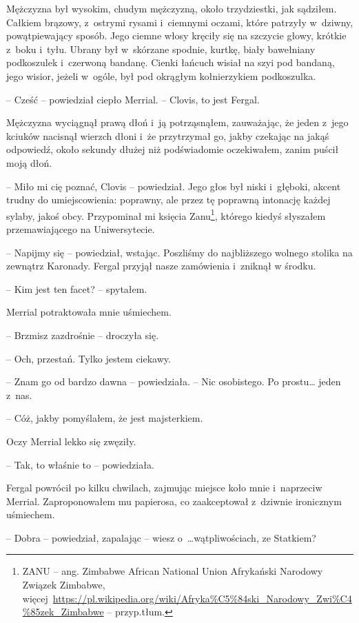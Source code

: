 \documentclass[oneside,polish,11pt,sfheadings]{mwbk}
\begin{document}
Mężczyzna był wysokim, chudym mężczyzną, około trzydziestki, jak
sądziłem. Całkiem brązowy, z~ostrymi rysami i~ciemnymi oczami, które
patrzyły w~dziwny, powątpiewający sposób. Jego ciemne włosy kręciły się
na szczycie głowy, krótkie z~boku i~tyłu. Ubrany był w~skórzane spodnie,
kurtkę, biały bawełniany podkoszulek i~czerwoną bandanę. Cienki łańcuch
wisiał na szyi pod bandaną, jego wisior, jeżeli w~ogóle, był pod okrągłym
kołnierzykiem podkoszulka.

-- Cześć -- powiedział ciepło Merrial. -- Clovis, to jest Fergal.

Mężczyzna wyciągnął prawą dłoń i~ją potrząsnąłem, zauważając, że jeden z~jego kciuków nacisnął wierzch dłoni i~że przytrzymał go, jakby czekając
na jakąś odpowiedź, około sekundy dłużej niż podświadomie oczekiwałem,
zanim puścił moją dłoń.

-- Miło mi cię poznać, Clovis -- powiedział. Jego głos był niski i~głęboki, akcent trudny do umiejscowienia: poprawny, ale przez tę
poprawną intonację każdej sylaby, jakoś obcy. Przypominał mi księcia
Zanu\footnote{ ZANU -- ang. Zimbabwe African National Union Afrykański Narodowy
Związek Zimbabwe,
więcej~\url{https://pl.wikipedia.org/wiki/Afryka\%C5\%84ski\_Narodowy\_Zwi\%C4\%85zek\_Zimbabwe}
-- przyp.tłum.}, którego kiedyś słyszałem przemawiającego na
Uniwersytecie.

-- Napijmy się -- powiedział, wstając. Poszliśmy do najbliższego wolnego
stolika na zewnątrz Karonady. Fergal przyjął nasze zamówienia i~zniknął
w środku.

-- Kim jest ten facet? -- spytałem.

Merrial potraktowała mnie uśmiechem. 

-- Brzmisz zazdrośnie -- droczyła
się.

-- Och, przestań. Tylko jestem ciekawy.

-- Znam go od bardzo dawna -- powiedziała. -- Nic osobistego. Po prostu\ldots
jeden z~nas.

-- Cóż, jakby pomyślałem, że jest majsterkiem.

Oczy Merrial lekko się zwęziły. 

-- Tak, to właśnie to -- powiedziała.

Fergal powrócił po kilku chwilach, zajmując miejsce koło mnie i~naprzeciw Merrial. Zaproponowałem mu papierosa, co zaakceptował z~dziwnie ironicznym uśmiechem.

-- Dobra -- powiedział, zapalając -- wiesz o~\ldots wątpliwościach, ze
Statkiem?
\end{document}
